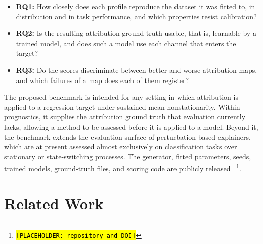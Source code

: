 \documentclass{article}
\newif\ifreview \reviewtrue        %
\newcommand{\rev}[1]{\ifreview\textcolor[HTML]{0B5FA5}{#1}\else#1\fi}
\newcommand{\revwhy}[1]{\ifreview\marginpar{\footnotesize\raggedright\textcolor[HTML]{0B5FA5}{#1}}\fi}
\begin{document}
\begin{itemize}
    \item \textbf{RQ1:} How closely does each profile reproduce the dataset it was fitted to, in distribution and in task performance, and which properties resist calibration?
    \item \textbf{RQ2:} Is the resulting attribution ground truth usable, that is, learnable by a trained model\rev{, and does such a model use each channel that enters the target?}
    \item \textbf{RQ3:} Do the scores discriminate between better and worse attribution maps, and \rev{which failures of a map does each of them register?}\revwhy{FIX-4, FIX-7: RQ2 and RQ3 in the v2 scope (X4, X5, D25)}
\end{itemize}
 
The proposed benchmark is intended for any setting in which attribution is applied to a regression target under sustained mean-nonstationarity. Within prognostics, it supplies the attribution ground truth that evaluation currently lacks, allowing a method to be assessed before it is applied to a model. Beyond it, the benchmark extends the evaluation surface of perturbation-based explainers, which are at present assessed almost exclusively on classification tasks over stationary or state-switching processes. The generator, fitted parameters, seeds, trained models, ground-truth files, and scoring code are publicly released ~\footnote{\hl{\texttt{[PLACEHOLDER: repository and DOI]}}}.

 
\section{Related Work}
\end{document}
